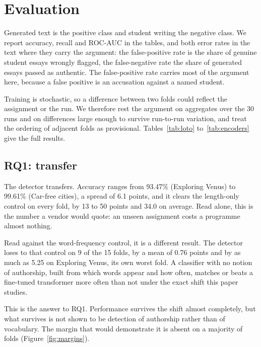 \documentclass[11pt,a4paper]{article}
\begin{document}
\section{Evaluation}

Generated text is the positive class and student writing the negative
class. We report accuracy, recall and ROC-AUC in the tables, and both
error rates in the text where they carry the argument: the false-positive
rate is the share of genuine student essays wrongly flagged, the
false-negative rate the share of generated essays passed as authentic.
The false-positive rate carries most of the argument here, because a
false positive is an accusation against a named student.

Training is stochastic, so a difference between two folds could reflect the
assignment or the run. We therefore rest the argument on aggregates over
the 30 runs and on differences large enough to survive run-to-run
variation, and treat the ordering of adjacent folds as provisional.
Tables~\ref{tab:loto} to~\ref{tab:encoders} give the full results.

\subsection{RQ1: transfer}

The detector transfers. Accuracy ranges from 93.47\% (Exploring Venus) to
99.61\% (Car-free cities), a spread of 6.1 points, and it clears the
length-only control on every fold, by 13 to 50 points and 34.0 on average.
Read alone, this is the number a vendor would quote: an unseen assignment
costs a programme almost nothing.

Read against the word-frequency control, it is a different result. The
detector loses to that control on 9 of the 15 folds, by a mean of 0.76
points and by as much as 5.25 on Exploring Venus, its own worst fold. A
classifier with no notion of authorship, built from which words appear and
how often, matches or beats a fine-tuned transformer more often than not
under the exact shift this paper studies.

This is the answer to RQ1. Performance survives the shift almost
completely, but what survives is not shown to be detection of authorship
rather than of vocabulary. The margin that would demonstrate it is absent
on a majority of folds (Figure~\ref{fig:margins}).
\end{document}
